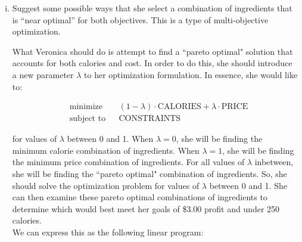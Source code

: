 \documentclass[../main.tex]{subfiles}
\begin{document}
\begin{enumerate}[i.]
	\item Suggest some possible ways that she select a combination of ingredients that is “near optimal” for both objectives. This is a type of multi-objective optimization.

	What Veronica should do is attempt to find a ``pareto optimal" solution that accounts for both calories and cost. In order to do this, she should introduce a new parameter $\lambda$ to her optimization formulation. In essence, she would like to:

	\begin{equation*}
		\begin{aligned}
			&\text{minimize} & & (1 - \lambda) \cdot \text{CALORIES} + \lambda \cdot \text{PRICE} \\
			&\text{subject to} & & \text{CONSTRAINTS}
		\end{aligned}
	\end{equation*}

	for values of $\lambda$ between 0 and 1. When $\lambda = 0$, she will be finding the minimum calorie combination of ingredients. When $\lambda = 1$, she will be finding the minimum price combination of ingredients. For all values of $\lambda$ inbetween, she will be finding the ``pareto optimal" combination of ingredients. So, she should solve the optimization problem for values of $\lambda$ between 0 and 1. She can then examine these pareto optimal combinations of ingredients to determine which would best meet her goals of \$3.00 profit and under 250 calories. \\

	We can express this as the following linear program:


\end{enumerate}
\end{document}

